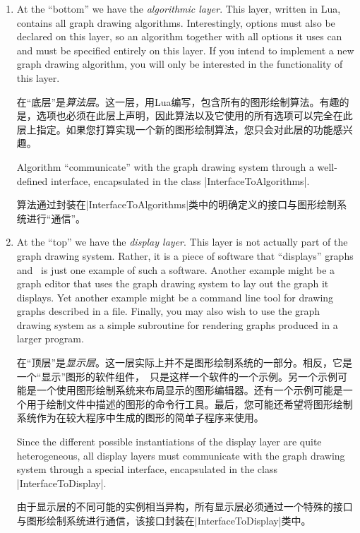 \begin{enumerate}
    \item At the ``bottom'' we have the \emph{algorithmic layer}. This layer,
        written in Lua, contains all graph drawing algorithms. Interestingly,
        options must also be declared on this layer, so an algorithm together
        with all options it uses can and must be specified entirely on this
        layer. If you intend to implement a new graph drawing algorithm, you
        will only be interested in the functionality of this layer.

        在“底层”是\emph{算法层}。这一层，用Lua编写，包含所有的图形绘制算法。有趣的是，选项也必须在此层上声明，因此算法以及它使用的所有选项可以完全在此层上指定。如果您打算实现一个新的图形绘制算法，您只会对此层的功能感兴趣。

        Algorithm ``communicate'' with the graph drawing system through a
        well-defined interface, encapsulated in the class
        |InterfaceToAlgorithms|.

        算法通过封装在|InterfaceToAlgorithms|类中的明确定义的接口与图形绘制系统进行“通信”。


    \item At the ``top'' we have the \emph{display layer}. This layer is not
        actually part of the graph drawing system. Rather, it is a piece of
        software that ``displays'' graphs and \tikzname\ is just one example of
        such a software. Another example might be a graph editor that uses the
        graph drawing system to lay out the graph it displays. Yet another
        example might be a command line tool for drawing graphs described in a
        file. Finally, you may also wish to use the graph drawing system as a
        simple subroutine for rendering graphs produced in a larger program.

        在“顶层”是\emph{显示层}。这一层实际上并不是图形绘制系统的一部分。相反，它是一个“显示”图形的软件组件，\tikzname\ 只是这样一个软件的一个示例。另一个示例可能是一个使用图形绘制系统来布局显示的图形编辑器。还有一个示例可能是一个用于绘制文件中描述的图形的命令行工具。最后，您可能还希望将图形绘制系统作为在较大程序中生成的图形的简单子程序来使用。

        Since the different possible instantiations of the display layer are
        quite heterogeneous, all display layers must communicate with the graph
        drawing system through a special interface, encapsulated in the class
        |InterfaceToDisplay|.

        由于显示层的不同可能的实例相当异构，所有显示层必须通过一个特殊的接口与图形绘制系统进行通信，该接口封装在|InterfaceToDisplay|类中。



\end{enumerate}
